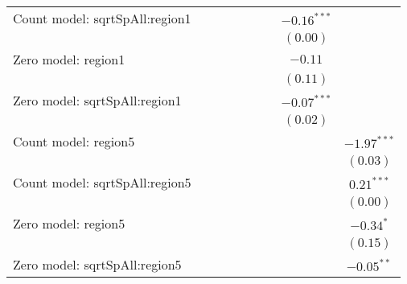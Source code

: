 \begin{sidewaystable}
\begin{center}
{\begin{tabular}{l c c c c c c c c}
Count model: sqrtSpAll:region1 &               &               &               &                 &               &               & $-0.16^{***}$  &               \\
                               &               &               &               &                 &               &               & $(0.00)$       &               \\
Zero model: region1            &               &               &               &                 &               &               & $-0.11$        &               \\
                               &               &               &               &                 &               &               & $(0.11)$       &               \\
Zero model: sqrtSpAll:region1  &               &               &               &                 &               &               & $-0.07^{***}$  &               \\
                               &               &               &               &                 &               &               & $(0.02)$       &               \\
Count model: region5           &               &               &               &                 &               &               &                & $-1.97^{***}$ \\
                               &               &               &               &                 &               &               &                & $(0.03)$      \\
Count model: sqrtSpAll:region5 &               &               &               &                 &               &               &                & $0.21^{***}$  \\
                               &               &               &               &                 &               &               &                & $(0.00)$      \\
Zero model: region5            &               &               &               &                 &               &               &                & $-0.34^{*}$   \\
                               &               &               &               &                 &               &               &                & $(0.15)$      \\
Zero model: sqrtSpAll:region5  &               &               &               &                 &               &               &                & $-0.05^{**}$  \\

\end{tabular}}
\end{center}
\end{sidewaystable}
